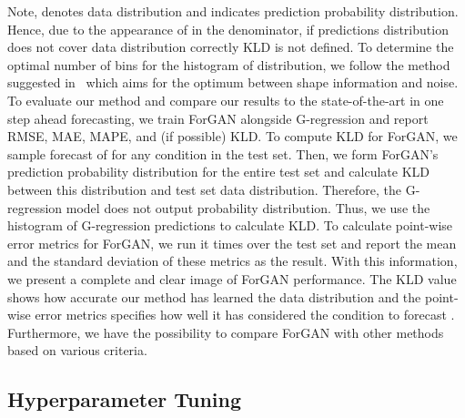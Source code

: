 \documentclass{ieeeaccess}
\begin{document}
Note,  denotes data distribution and  indicates prediction probability distribution. Hence, due to the appearance of  in the denominator, if predictions distribution does not cover data distribution correctly KLD is not defined. To determine the optimal number of bins for the histogram of distribution, we follow the method suggested in~\cite{knuth2006optimal} which aims for the optimum between shape information and noise. 
To evaluate our method and compare our results to the state-of-the-art in one step ahead forecasting, we train ForGAN alongside G-regression and report RMSE, MAE, MAPE, and (if possible) KLD. To compute KLD for ForGAN, we sample  forecast of  for any condition in the test set. Then, we form ForGAN's prediction probability distribution for the entire test set and calculate KLD between this distribution and test set data distribution. Therefore, the G-regression model does not output probability distribution. Thus, we use the histogram of G-regression predictions to calculate KLD. To calculate point-wise error metrics for ForGAN, we run it  times over the test set and report the mean and the standard deviation of these metrics as the result. With this information, we present a complete and clear image of ForGAN performance. The KLD value shows how accurate our method has learned the data distribution and the point-wise error metrics specifies how well it has considered the condition to forecast . Furthermore, we have the possibility to compare ForGAN with other methods based on various criteria.
\subsection{Hyperparameter Tuning}
\label{sec:hp_tune}
\end{document}
